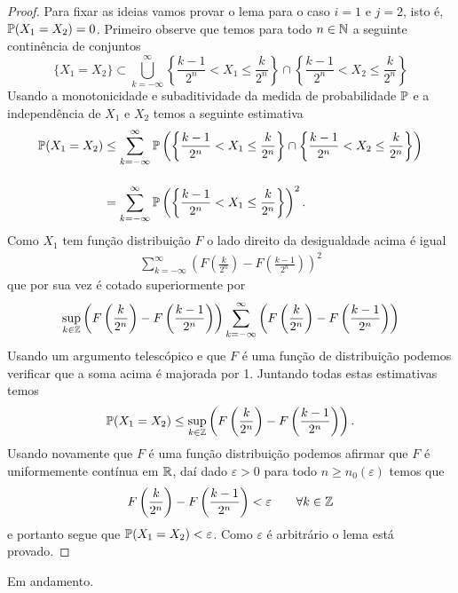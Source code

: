 \begin{proof}
Para fixar as ideias vamos provar o lema para 
o caso $i=1$ e $j=2$, isto é, $\P(X_1=X_2)=0$.
Primeiro observe que temos para todo $n\in\N$ 
a seguinte continência de conjuntos 
	\[
	\{X_1=X_2\}
	\subset
	\bigcup_{k=-\infty}^{\infty}
	\left\{
		\frac{k-1}{2^n}<X_1\leq \frac{k}{2^n}
	\right\}
	\cap
	\left\{
		\frac{k-1}{2^n}<X_2\leq \frac{k}{2^n}
	\right\}
	\]
Usando a monotonicidade e subaditividade da medida
de probabilidade $\P$ e a independência de 
$X_1$ e $X_2$ temos a seguinte estimativa
	\begin{align*}
	\P(X_1=X_2)
	&\leq
	\sum_{k=-\infty}^{\infty}
	\P \left(
		\left\{
			\frac{k-1}{2^n}<X_1\leq \frac{k}{2^n}
		\right\}
		\cap
		\left\{
			\frac{k-1}{2^n}<X_2\leq \frac{k}{2^n}
		\right\}
	\right)
	\\[0.4cm]
	&=
	\sum_{k=-\infty}^{\infty}
	\P \left(
		\left\{
			\frac{k-1}{2^n}<X_1\leq \frac{k}{2^n}
		\right\}
	\right)^2.
	\end{align*}
%
%
%
Como $X_1$ tem função distribuição $F$ o lado 
direito da desigualdade acima é igual 
	\begin{align*}
	\sum_{k=-\infty}^{\infty}
	\left(
		F\left(\frac{k}{2^n}\right)
		-
		F\left(\frac{k-1}{2^n}\right)
	\right)^2
	\end{align*}
que por sua vez é cotado superiormente por 
	\begin{align*}
	\sup_{k\in\Z}
		\left(
			F\left(\frac{k}{2^n}\right)
			-
			F\left(\frac{k-1}{2^n}\right)
		\right)
	\sum_{k=-\infty}^{\infty}
	\left(
		F\left(\frac{k}{2^n}\right)
		-
		F\left(\frac{k-1}{2^n}\right)
	\right)	
	\end{align*}
Usando um argumento telescópico e que $F$ é uma 
função de distribuição podemos verificar que a soma
acima é majorada por 1. Juntando todas estas estimativas
temos
	\begin{align*}
	\P(X_1=X_2)
	\leq 
	\sup_{k\in\Z}
		\left(
			F\left(\frac{k}{2^n}\right)
			-
			F\left(\frac{k-1}{2^n}\right)
		\right).
	\end{align*}
 Usando novamente que $F$ é uma função distribuição podemos
 afirmar que $F$ é uniformemente contínua em $\R$, daí dado 
 $\varepsilon>0$ para todo $n\geq n_0(\varepsilon)$ temos que 
	\[
			F\left(\frac{k}{2^n}\right)
			-
			F\left(\frac{k-1}{2^n}\right)
			< 
			\varepsilon
			\qquad
			\forall k\in\Z
	\]  
e portanto segue que $\P(X_1=X_2)< \varepsilon$. 
Como $\varepsilon$ é arbitrário o lema está provado.
\end{proof}


\begin{center}
	{\red Em andamento.}
\end{center}


